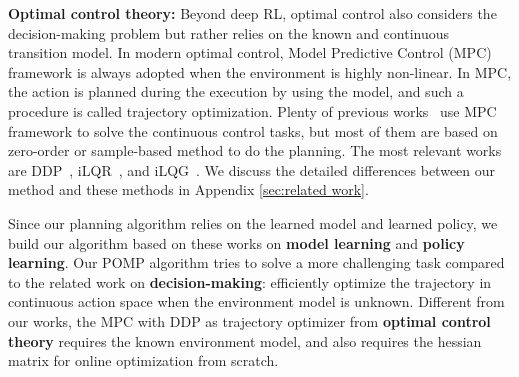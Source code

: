 \documentclass{article} %
\newcommand{\lijun}[1]{ {#1}}
\newcommand{\yue}[1]{ {#1}}
\begin{document}
\textbf{Optimal control theory:}
Beyond deep RL, optimal control  also considers the decision-making problem but rather relies on the known and continuous transition model. 
In modern optimal control, Model Predictive Control (MPC)~\citep{camacho2013model} framework is always adopted when the environment is highly non-linear. In MPC, the action is planned during the execution by using the model, and such a procedure is called trajectory optimization. \yue{Plenty of previous works~\citep{byravan2021evaluating,chua_deep_2018,pinneri2021sample,nagabandi2020deep} use MPC framework to solve  the continuous control tasks, but most of them are based on zero-order or sample-based method to do the planning.} 
 \yue{The most relevant works are DDP~\citep{murray1984differential}, iLQR~\citep{li2004iterative}, and  iLQG~\citep{todorov2005generalized,tassa2012synthesis}. We discuss the detailed differences between our method and these methods in Appendix \ref{sec:related work}.}



Since our planning algorithm relies on the learned model and learned policy, we build our algorithm based on these works on \textbf{model learning} and \textbf{policy learning}.
Our POMP algorithm tries to solve a more challenging task compared to the related work on \textbf{decision-making}: efficiently optimize the trajectory in continuous action space when the environment model is unknown. 
Different from our works, the MPC with DDP as trajectory optimizer from \textbf{optimal control theory}  requires the known environment model, and also requires the  hessian matrix  for  online optimization from scratch.  
\end{document}
